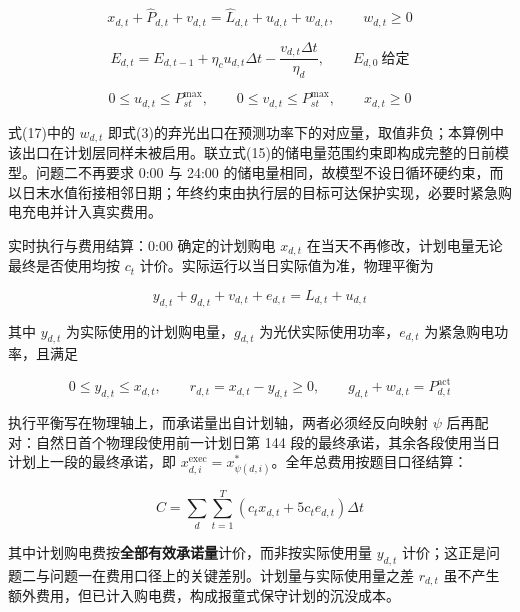 \documentclass[12pt,a4paper]{ctexart}
\begin{document}
\begin{equation}
x_{d,t}+\widehat{P}_{d,t}+v_{d,t}=\widehat{L}_{d,t}+u_{d,t}+w_{d,t},\qquad w_{d,t}\ge0
\end{equation}

\begin{equation}
E_{d,t}=E_{d,t-1}+\eta_c u_{d,t}\Delta t-\frac{v_{d,t}\Delta t}{\eta_d},\qquad E_{d,0}\ \text{给定}
\end{equation}

\begin{equation}
0\le u_{d,t}\le P_{st}^{\max},\qquad 0\le v_{d,t}\le P_{st}^{\max},\qquad x_{d,t}\ge0
\end{equation}

式(17)中的 $w_{d,t}$ 即式(3)的弃光出口在预测功率下的对应量，取值非负；本算例中该出口在计划层同样未被启用。联立式(15)的储电量范围约束即构成完整的日前模型。问题二不再要求 0:00 与 24:00 的储电量相同，故模型不设日循环硬约束，而以日末水值衔接相邻日期；年终约束由执行层的目标可达保护实现，必要时紧急购电充电并计入真实费用。

实时执行与费用结算：0:00 确定的计划购电 $x_{d,t}$ 在当天不再修改，计划电量无论最终是否使用均按 $c_t$ 计价。实际运行以当日实际值为准，物理平衡为

\begin{equation}
y_{d,t}+g_{d,t}+v_{d,t}+e_{d,t}=L_{d,t}+u_{d,t}
\end{equation}

其中 $y_{d,t}$ 为实际使用的计划购电量，$g_{d,t}$ 为光伏实际使用功率，$e_{d,t}$ 为紧急购电功率，且满足

\begin{equation}
0\le y_{d,t}\le x_{d,t},\qquad r_{d,t}=x_{d,t}-y_{d,t}\ge0,\qquad g_{d,t}+w_{d,t}=P_{d,t}^{\mathrm{act}}
\end{equation}

执行平衡写在物理轴上，而承诺量出自计划轴，两者必须经反向映射 $\psi$ 后再配对：自然日首个物理段使用前一计划日第 144 段的最终承诺，其余各段使用当日计划上一段的最终承诺，即 $x_{d,i}^{\mathrm{exec}}=x_{\psi(d,i)}^{*}$。全年总费用按题目口径结算：

\begin{equation}
C=\sum_{d}\sum_{t=1}^{T}\left(c_t x_{d,t}+5c_t e_{d,t}\right)\Delta t
\end{equation}

其中计划购电费按\textbf{全部有效承诺量}计价，而非按实际使用量 $y_{d,t}$ 计价；这正是问题二与问题一在费用口径上的关键差别。计划量与实际使用量之差 $r_{d,t}$ 虽不产生额外费用，但已计入购电费，构成报童式保守计划的沉没成本。
\end{document}
